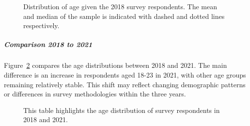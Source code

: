 \documentclass[
  letterpaper,
  DIV=11,
  numbers=noendperiod]{scrartcl}
\let\oldsubparagraph\subparagraph
\renewcommand{\subparagraph}[1]{\oldsubparagraph{#1}\mbox{}}
\begin{document}
\begin{figure}


\caption{\label{fig-one}Distribution of age given the 2018 survey
respondents. The mean and median of the sample is indicated with dashed
and dotted lines respectively.}

\end{figure}%

\newpage

\subparagraph{Comparison 2018 to 2021}\label{comparison-2018-to-2021}

Figure~\ref{fig-two} compares the age distributions between 2018 and
2021. The main difference is an increase in respondents aged 18-23 in
2021, with other age groups remaining relatively stable. This shift may
reflect changing demographic patterns or differences in survey
methodologies within the three years.

\begin{figure}


\caption{\label{fig-two}This table highlights the age distribution of
survey respondents in 2018 and 2021.}

\end{figure}%
\end{document}
